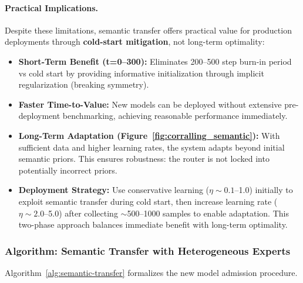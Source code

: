 \paragraph{Practical Implications.}
Despite these limitations, semantic transfer offers practical value for production deployments through \textbf{cold-start mitigation}, not long-term optimality:

\begin{itemize}
    \item \textbf{Short-Term Benefit (t=0--300):} Eliminates 200--500 step burn-in period vs cold start by providing informative initialization through implicit regularization (breaking symmetry).
    
    \item \textbf{Faster Time-to-Value:} New models can be deployed without extensive pre-deployment benchmarking, achieving reasonable performance immediately.
    
    \item \textbf{Long-Term Adaptation (Figure~\ref{fig:corralling_semantic}):} With sufficient data and higher learning rates, the system adapts beyond initial semantic priors. This ensures robustness: the router is not locked into potentially incorrect priors.
    
    \item \textbf{Deployment Strategy:} Use conservative learning ($\eta \sim 0.1$--1.0) initially to exploit semantic transfer during cold start, then increase learning rate ($\eta \sim 2.0$--5.0) after collecting $\sim$500--1000 samples to enable adaptation. This two-phase approach balances immediate benefit with long-term optimality.
\end{itemize}

\subsubsection{Algorithm: Semantic Transfer with Heterogeneous Experts}

Algorithm~\ref{alg:semantic-transfer} formalizes the new model admission procedure.

